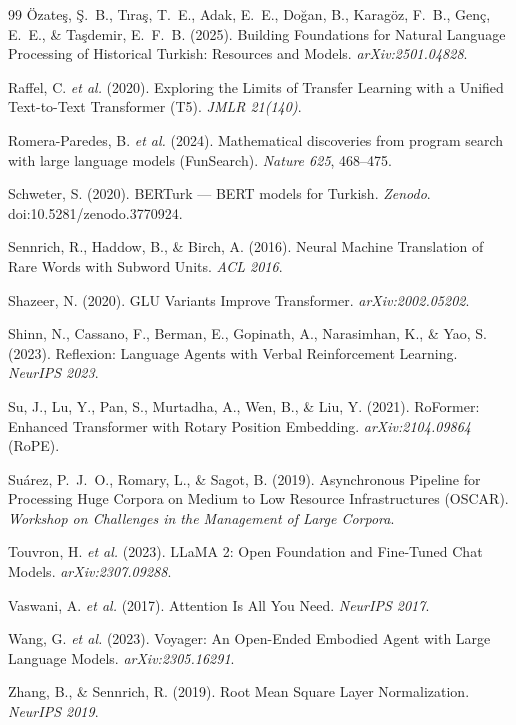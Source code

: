 \documentclass[11pt,a4paper]{article}
\begin{document}
\begin{thebibliography}{99}
Özateş, Ş.~B., Tıraş, T.~E., Adak, E.~E., Doğan, B., Karagöz, F.~B.,
Genç, E.~E., \& Taşdemir, E.~F.~B. (2025).
\newblock Building Foundations for Natural Language Processing of Historical Turkish: Resources and Models.
\newblock \emph{arXiv:2501.04828}.

Raffel, C. \emph{et al.} (2020).
\newblock Exploring the Limits of Transfer Learning with a Unified Text-to-Text Transformer (T5).
\newblock \emph{JMLR 21(140)}.

Romera-Paredes, B. \emph{et al.} (2024).
\newblock Mathematical discoveries from program search with large language models (FunSearch).
\newblock \emph{Nature 625}, 468--475.

Schweter, S. (2020).
\newblock BERTurk — BERT models for Turkish.
\newblock \emph{Zenodo}. doi:10.5281/zenodo.3770924.

Sennrich, R., Haddow, B., \& Birch, A. (2016).
\newblock Neural Machine Translation of Rare Words with Subword Units.
\newblock \emph{ACL 2016}.

Shazeer, N. (2020).
\newblock GLU Variants Improve Transformer.
\newblock \emph{arXiv:2002.05202}.

Shinn, N., Cassano, F., Berman, E., Gopinath, A., Narasimhan, K., \& Yao, S. (2023).
\newblock Reflexion: Language Agents with Verbal Reinforcement Learning.
\newblock \emph{NeurIPS 2023}.

Su, J., Lu, Y., Pan, S., Murtadha, A., Wen, B., \& Liu, Y. (2021).
\newblock RoFormer: Enhanced Transformer with Rotary Position Embedding.
\newblock \emph{arXiv:2104.09864} (RoPE).

Suárez, P.~J.~O., Romary, L., \& Sagot, B. (2019).
\newblock Asynchronous Pipeline for Processing Huge Corpora on Medium to Low Resource Infrastructures (OSCAR).
\newblock \emph{Workshop on Challenges in the Management of Large Corpora}.

Touvron, H. \emph{et al.} (2023).
\newblock LLaMA 2: Open Foundation and Fine-Tuned Chat Models.
\newblock \emph{arXiv:2307.09288}.

Vaswani, A. \emph{et al.} (2017).
\newblock Attention Is All You Need.
\newblock \emph{NeurIPS 2017}.

Wang, G. \emph{et al.} (2023).
\newblock Voyager: An Open-Ended Embodied Agent with Large Language Models.
\newblock \emph{arXiv:2305.16291}.

Zhang, B., \& Sennrich, R. (2019).
\newblock Root Mean Square Layer Normalization.
\newblock \emph{NeurIPS 2019}.

\end{thebibliography}
\end{document}
